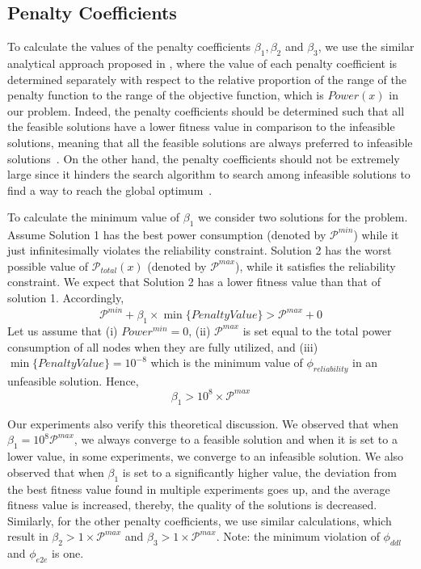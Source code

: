 \subsection{Penalty Coefficients}
\label{sec:penaltycoefficient}
To calculate the values of the penalty coefficients $\beta_1,\beta_2$ and $\beta_3$, we use the similar analytical approach proposed in \cite{Faragardi2018AnSystems},
where the value of each penalty coefficient is determined separately with respect to the relative proportion of the range of the penalty function to the range of the objective function, which is $Power(x)$ in our problem. Indeed, the penalty coefficients should be determined such that all the feasible solutions have a lower fitness value in comparison to the infeasible solutions, meaning that all the feasible solutions are always preferred to infeasible solutions~\cite{faragardi2018AECUs}. On the other hand, the penalty coefficients should not be extremely large since it hinders the search algorithm to search among infeasible solutions to find a way to reach the global optimum~\cite{Talbi2009Metaheuristics:Implementation}.

To calculate the minimum value of $\beta_1$ we consider two solutions for the problem. Assume Solution 1 has the best power consumption (denoted by $\mathcal{P}^{min}$) while it just infinitesimally violates the reliability constraint. Solution 2 has the worst possible value of $\mathcal{P}_{total}(x)$ (denoted by $\mathcal{P}^{max}$), while it satisfies the reliability constraint. We expect that Solution 2 has a lower fitness value than that of solution 1. Accordingly,
\begin{equation*}
\label{eqn_PnelatyMem1}
\mathcal{P}^{min} + \beta_1 \times \min\{Penalty Value\} > \mathcal{P}^{max} + 0
\end{equation*}  
Let us assume that (i) $Power^{min} = 0$, (ii) $\mathcal{P}^{max}$ is set equal to the total power consumption of all nodes when they are fully utilized, and (iii) $\min\{Penalty Value\} = 10^{-8}$ which is the minimum value of $\phi_{reliability}$ in an unfeasible solution. Hence,
\begin{equation*}
\label{eqn_PnelatyMem2}
\beta_1 > 10^8 \times \mathcal{P}^{max}
\end{equation*}  

Our experiments also verify this theoretical discussion. We observed that when $\beta_1 = 10^8\mathcal{P}^{max}$, we always converge to a feasible solution and when it is set to a lower value, in some experiments, we converge to an infeasible solution. We also observed that when $\beta_1$ is set to a significantly higher value, the deviation from the best fitness value found in multiple experiments goes up, and the average fitness value is increased, thereby, the quality of the solutions is decreased. Similarly, for the other penalty coefficients, we use similar calculations, which result in $\beta_2 > 1 \times \mathcal{P}^{max}$ and
$\beta_3 > 1 \times \mathcal{P}^{max}$. Note: the minimum violation of $\phi_{ddl}$ and $\phi_{e2e}$ is one.

